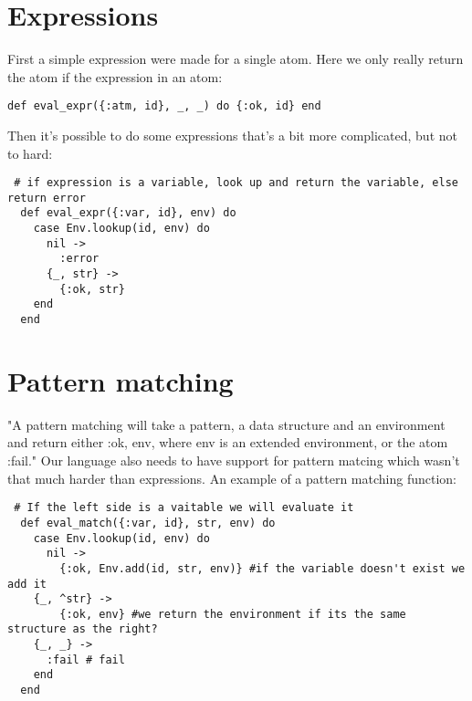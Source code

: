 \documentclass[a4paper,11pt]{article}
\begin{document}
\section{Expressions}
First a simple expression were made for a single atom. Here we only really return the atom if the expression in an atom:

\begin{verbatim}
def eval_expr({:atm, id}, _, _) do {:ok, id} end
\end{verbatim}

Then it's possible to do some expressions that's a bit more complicated, but not to hard:
\begin{verbatim}
 # if expression is a variable, look up and return the variable, else return error
  def eval_expr({:var, id}, env) do
    case Env.lookup(id, env) do
      nil ->
        :error
      {_, str} ->
        {:ok, str}
    end
  end
 \end{verbatim}


\section{Pattern matching}
"A pattern matching will take a pattern, a data structure and an environment and return either {:ok, env}, where env is an extended environment, or the atom :fail." Our language also needs to have support for pattern matcing which wasn't that much harder than expressions. An example of a pattern matching function:

\begin{verbatim}
 # If the left side is a vaitable we will evaluate it
  def eval_match({:var, id}, str, env) do
    case Env.lookup(id, env) do
      nil ->
        {:ok, Env.add(id, str, env)} #if the variable doesn't exist we add it
    {_, ^str} ->
        {:ok, env} #we return the environment if its the same structure as the right?
    {_, _} ->
      :fail # fail
    end
  end
\end{verbatim}
\end{document}
